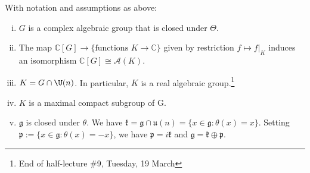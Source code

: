 \documentclass[reqno]{amsart} 
\begin{document}
\begin{theorem}\label{thm:complexification-compact-lie-basic-properties}
  With notation and assumptions as above:
  \begin{enumerate}
[(i)]
  \item $G$ is a complex algebraic group that is closed under $\Theta$.
  \item The map $\mathbb{C}[G] \rightarrow \{\text{functions } K \rightarrow \mathbb{C} \}$ given by restriction $f \mapsto f|_K$ induces an isomorphism $\mathbb{C}[G] \cong \mathcal{A}(K)$.
  \item $K = G \cap \U(n)$.  In particular, $K$ is a real algebraic group.\footnote{End of half-lecture \#9, Tuesday, 19 March}
  \item $K$ is a maximal compact subgroup of G.
  \item $\mathfrak{g}$ is closed under $\theta$.  We have $\mathfrak{k} = \mathfrak{g} \cap \mathfrak{u}(n) = \{x \in \mathfrak{g} : \theta(x) = x \}$.  Setting $\mathfrak{p} := \{x \in \mathfrak{g} : \theta(x) = - x\}$, we have $\mathfrak{p} = i \mathfrak{k}$ and $\mathfrak{g} = \mathfrak{k} \oplus \mathfrak{p}$.
  \end{enumerate}
\end{theorem}
\end{document}
